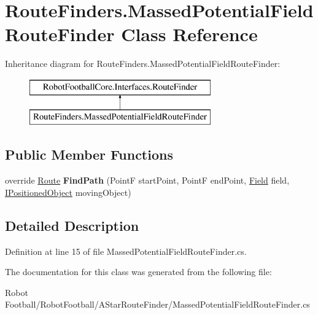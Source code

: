 \hypertarget{class_route_finders_1_1_massed_potential_field_route_finder}{\section{Route\-Finders.\-Massed\-Potential\-Field\-Route\-Finder Class Reference}
\label{class_route_finders_1_1_massed_potential_field_route_finder}
}
Inheritance diagram for Route\-Finders.\-Massed\-Potential\-Field\-Route\-Finder\-:\begin{figure}[H]
\begin{center}
\leavevmode
\includegraphics[height=2.000000cm]{class_route_finders_1_1_massed_potential_field_route_finder}
\end{center}
\end{figure}
\subsection*{Public Member Functions}
\begin{DoxyCompactItemize}
\item 
\hypertarget{class_route_finders_1_1_massed_potential_field_route_finder_ac5f49226db488448e6f596c5322f145c}{override \hyperlink{class_robot_football_core_1_1_route_objects_1_1_route}{Route} {\bfseries Find\-Path} (Point\-F start\-Point, Point\-F end\-Point, \hyperlink{class_robot_football_core_1_1_objects_1_1_field}{Field} field, \hyperlink{interface_robot_football_core_1_1_interfaces_1_1_i_positioned_object}{I\-Positioned\-Object} moving\-Object)}\label{class_route_finders_1_1_massed_potential_field_route_finder_ac5f49226db488448e6f596c5322f145c}

\end{DoxyCompactItemize}


\subsection{Detailed Description}


Definition at line 15 of file Massed\-Potential\-Field\-Route\-Finder.\-cs.



The documentation for this class was generated from the following file\-:\begin{DoxyCompactItemize}
\item 
Robot Football/\-Robot\-Football/\-A\-Star\-Route\-Finder/Massed\-Potential\-Field\-Route\-Finder.\-cs\end{DoxyCompactItemize}
